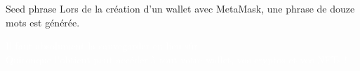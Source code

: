 \begin{frame}{Seed phrase}
  Lors de la création d'un wallet avec MetaMask, une phrase de douze mots est générée.

  \begin{center}
    \begin{tcolorbox}[arc=1ex, colback=myuniversity, colframe=myuniversity, left=3pt, right=3pt, top=3pt, bottom=2pt]
      \vspace*{1cm}
      \begin{center}
        \begin{huge}
          \textcolor{white}{
            Il faut absolument la sauvegarder en lieu sûr.\\
            Quiconque l'obtient peut accéder à tout votre wallet, vos cryptos et vos NFTs !
          }
        \end{huge}
      \end{center}
      \vspace*{1cm}
    \end{tcolorbox}
  \end{center}
\end{frame}